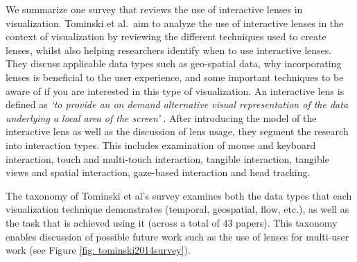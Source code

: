 We summarize one survey that reviews the use of interactive lenses in visualization.
Tominski et al.\ aim to analyze the use of interactive lenses in the context of visualization by reviewing the different techniques used to create lenses, whilst also helping researchers identify when to use interactive lenses. They discuss applicable data types such as geo-spatial data, why incorporating lenses is beneficial to the user experience, and some important techniques to be aware of if you are interested in this type of visualization. An interactive lens is defined as \textit{`to provide an on
demand alternative visual representation of the data underlying a local area of the screen'} \cite{tominski2014survey}.
After introducing the model of the interactive lens as well as the discussion of lens usage, they segment the research into interaction types. This includes examination of mouse and keyboard interaction, touch and multi-touch interaction, tangible interaction, tangible views and spatial interaction, gaze-based interaction and head tracking. \cite{tominski2014survey}

The taxonomy of Tominski et al's survey examines both the data types that each visualization technique demonstrates (temporal, geospatial, flow, etc.), as well as the task that is achieved using it (across a total of 43 papers). This taxonomy enables discussion of possible future work such as the use of lenses for multi-user work (see Figure \ref{fig: tominski2014survey}).

